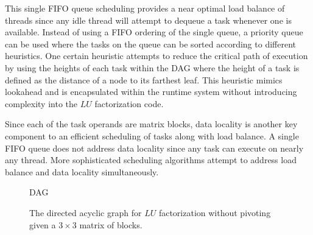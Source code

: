 This single FIFO queue scheduling provides a near optimal load balance
of threads since any idle thread will attempt to dequeue a task
whenever one is available.
Instead of using a FIFO ordering of the single queue, a priority queue
can be used where the tasks on the queue can be sorted according to
different heuristics.
One certain heuristic attempts to reduce the critical path of
execution by using the heights of each task within the \ac{DAG} where the
height of a task is defined as the distance of a node to its farthest
leaf.  %
This heuristic mimics lookahead and is encapsulated within the runtime
system without introducing complexity into the $LU$ factorization
code.

Since each of the task operands are matrix blocks, data locality is
another key component to an efficient scheduling of tasks along with
load balance.
A single FIFO queue does not address data locality since any task can
execute on nearly any thread.
More sophisticated scheduling algorithms attempt to address load
balance and data locality simultaneously.

\begin{figure}
\begin{center}
DAG
\end{center}
\caption{The directed acyclic graph for $LU$ factorization without
  pivoting given a $3 \times 3$ matrix of blocks.}
\label{fig:dag}
\end{figure}

